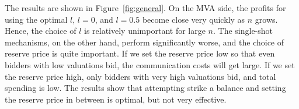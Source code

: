 The results are shown in Figure~\ref{fig:general}. 
On the MVA side, the profits for using the optimal $l$,
$l = 0$, and $l = 0.5$ become close very quickly as $n$ grows.
Hence, the choice of $l$ is relatively unimportant
for large $n$. 
The single-shot mechanisms, on the other hand, perform significantly worse,
and the choice of reserve price is quite important.
If we set the reserve price low so that even bidders with low valuations
bid, the communication costs will get large.
If we set the reserve price high, only bidders with very high valuations
bid, and total spending is low.  The results show that attempting strike a
balance and setting the reserve price in between is optimal, but not very effective. 




 





